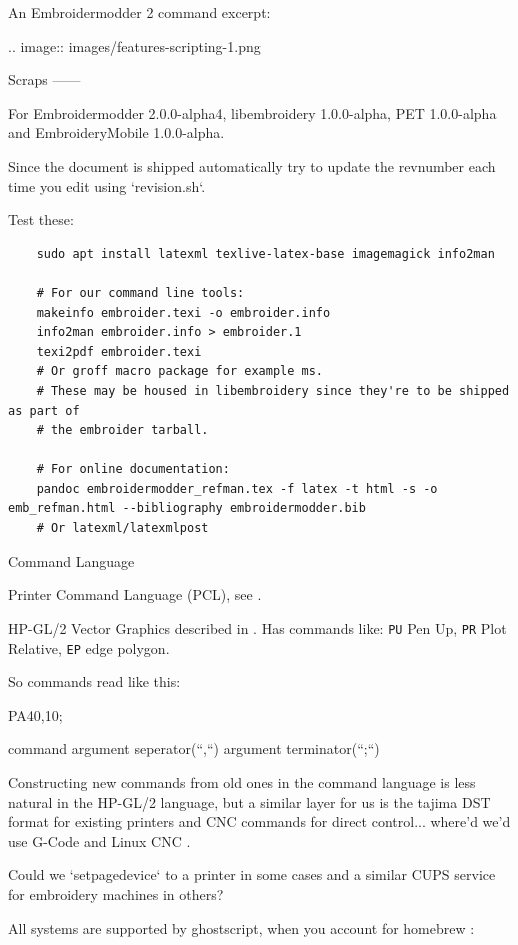 \documentclass[a4paper]{report}
\begin{document}
An Embroidermodder 2 command excerpt:

.. image::
   images/features-scripting-1.png


Scraps
------

For
Embroidermodder 2.0.0-alpha4, libembroidery 1.0.0-alpha, PET 1.0.0-alpha
and EmbroideryMobile 1.0.0-alpha.

Since the document is shipped automatically try to update the revnumber each
time you edit using `revision.sh`.

Test these:

\begin{lstlisting}
    sudo apt install latexml texlive-latex-base imagemagick info2man

    # For our command line tools:
    makeinfo embroider.texi -o embroider.info
    info2man embroider.info > embroider.1
    texi2pdf embroider.texi
    # Or groff macro package for example ms.
    # These may be housed in libembroidery since they're to be shipped as part of
    # the embroider tarball.

    # For online documentation:
    pandoc embroidermodder_refman.tex -f latex -t html -s -o emb_refman.html --bibliography embroidermodder.bib
    # Or latexml/latexmlpost
\end{lstlisting}

Command Language
~~~~~~~~~~~~~~~~

Printer Command Language (PCL), see \citet{packard1992pcl}.

HP-GL/2 Vector Graphics  described in \citet{packard1992pcl}.
Has commands like: \texttt{PU} Pen Up, \texttt{PR} Plot Relative,
\texttt{EP} edge polygon.

So commands read like this:

    PA40,10;

command argument seperator(``,``) argument terminator(``;``)

Constructing new commands from old ones in the command language is less
natural in the HP-GL/2 language, but a similar layer for us is
the tajima DST format \citep{4} for existing printers and CNC commands for
direct control... where'd we'd use G-Code \citep{7} and Linux CNC \citep{6}.

Could we `setpagedevice` to a printer in some cases and a similar CUPS service
for embroidery machines in others?

All systems are supported by ghostscript, when you account for homebrew \citet{9}:
\end{document}

